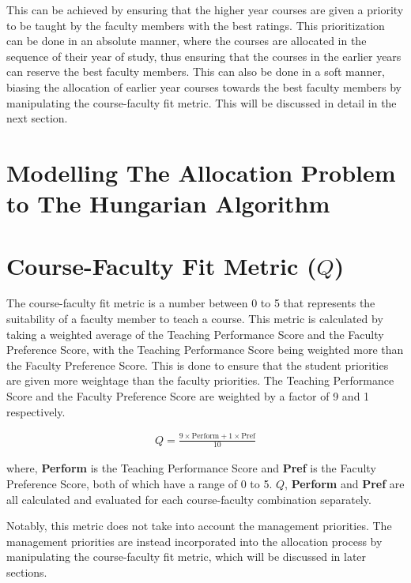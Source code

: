 This can be achieved by ensuring that the higher year courses are given a priority to be taught by the faculty members with the best ratings. This prioritization can be done in an absolute manner, where the courses are allocated in the sequence of their year of study, thus ensuring that the courses in the earlier years can reserve the best faculty members. This can also be done in a soft manner, biasing the allocation of earlier year courses towards the best faculty members by manipulating the course-faculty fit metric. This will be discussed in detail in the next section.


\section{Modelling The Allocation Problem to The Hungarian Algorithm}

\section{Course-Faculty Fit Metric (\(Q\))}

The course-faculty fit metric is a number between 0 to 5 that represents the suitability of a faculty member to teach a course. This metric is calculated by taking a weighted average of the Teaching Performance Score and the Faculty Preference Score, with the Teaching Performance Score being weighted more than the Faculty Preference Score. This is done to ensure that the student priorities are given more weightage than the faculty priorities. The Teaching Performance Score and the Faculty Preference Score are weighted by a factor of 9 and 1 respectively.

\begin{equation}
  \label{eq:course_faculty_fit}
  \begin{aligned}
    Q = \frac{9 \times \text{Perform} + 1 \times \text{Pref}}{10}
  \end{aligned}
\end{equation}

where, \textbf{Perform} is the Teaching Performance Score and \textbf{Pref} is the Faculty Preference Score, both of which have a range of 0 to 5. \(Q\), \textbf{Perform} and \textbf{Pref} are all calculated and evaluated for each course-faculty combination separately.

Notably, this metric does not take into account the management priorities. The management priorities are instead incorporated into the allocation process by manipulating the course-faculty fit metric, which will be discussed in later sections.

